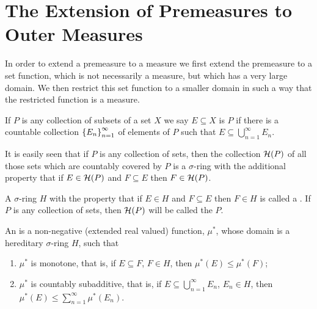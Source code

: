\section{The Extension of Premeasures to Outer Measures}

In order to extend a premeasure to a measure we first extend the premeasure to a set function, which is not necessarily a measure, but which has a very large domain. We then restrict this set function to a smaller domain in such a way that the restricted function is a measure.

\begin{definition}
If $P$ is any collection of subsets of a set $X$ we say $E\subseteq X$ is  $P$ if there is a countable collection $\left\{E_n\right\}_{n=1}^\infty$ of elements of $P$ such that $E\subseteq\bigcup_{n=1}^\infty E_n$.
\end{definition}

It is easily seen that if $P$ is any collection of sets, then the collection ${\cal H}(P)$ of all those sets which are countably covered by $P$ is a $\sigma$-ring with the additional property that if $E\in{\cal H}(P)$ and $F\subseteq E$ then $F\in{\cal H}(P)$.

\begin{definition}
A $\sigma$-ring $H$ with the property that if $E\in H$ and $F\subseteq E$ then $F\in H$ is called a .
If $P$ is any collection of sets, then ${\cal H}(P)$ will be called the  $P$.
\end{definition}

\begin{definition}
An  is a non-negative (extended real valued) function, $\mu^*$, whose domain is a hereditary $\sigma$-ring $H$, such that
\begin{enumerate}[label=\arabic*)]
    \item\label{def:outer measure 1}
    $\mu^*$ is monotone, that is, if $E\subseteq F$, $F\in H$, then $\mu^*(E)\leq\mu^*(F)$;
    \item\label{def:outer measure 2}
    $\mu^*$ is countably subadditive, that is, if $E\subseteq\bigcup_{n=1}^\infty E_n$, $E_n\in H$, then $\mu^*(E)\leq\sum_{n=1}^\infty\mu^*(E_n)$.
\end{enumerate}
\end{definition}

